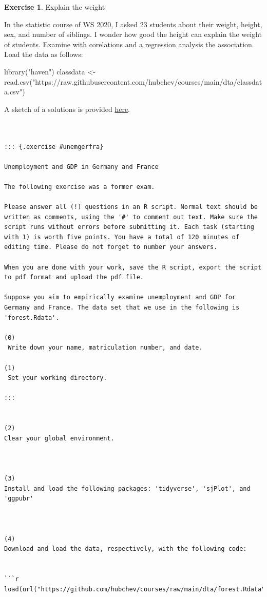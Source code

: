 \documentclass[
  12pt,
  oneside]{book}
\newenvironment{Shaded}{\begin{snugshade}}{\end{snugshade}}
\newcommand{\FunctionTok}[1]{\textcolor[rgb]{0.00,0.00,0.00}{#1}}
\newcommand{\NormalTok}[1]{#1}
\newcommand{\OtherTok}[1]{\textcolor[rgb]{0.56,0.35,0.01}{#1}}
\newcommand{\StringTok}[1]{\textcolor[rgb]{0.31,0.60,0.02}{#1}}
\theoremstyle{definition}
\theoremstyle{definition}
\theoremstyle{definition}
\newtheorem{exercise}{Exercise}[chapter]
\theoremstyle{definition}
\theoremstyle{remark}
\begin{document}
\begin{exercise}
\protect\hypertarget{exr:explainweight}{}\label{exr:explainweight}Explain the weight

In the statistic course of WS 2020, I asked 23 students about their weight, height, sex, and number of siblings. I wonder how good the height can explain the weight of students. Examine with corelations and a regression analysis the association. Load the data as follows:
\end{exercise}

\begin{Shaded}
\begin{Highlighting}[]
\FunctionTok{library}\NormalTok{(}\StringTok{"haven"}\NormalTok{)}
\NormalTok{classdata }\OtherTok{\textless{}{-}} \FunctionTok{read.csv}\NormalTok{(}\StringTok{"https://raw.githubusercontent.com/hubchev/courses/main/dta/classdata.csv"}\NormalTok{)}
\end{Highlighting}
\end{Shaded}

A sketch of a solutions is provided \href{https://raw.githubusercontent.com/hubchev/courses/main/scr/regress_lecture.R}{here}.

\begin{verbatim}


::: {.exercise #unemgerfra}

Unemployment and GDP in Germany and France

The following exercise was a former exam.

Please answer all (!) questions in an R script. Normal text should be written as comments, using the '#' to comment out text. Make sure the script runs without errors before submitting it. Each task (starting with 1) is worth five points. You have a total of 120 minutes of editing time. Please do not forget to number your answers.
 
When you are done with your work, save the R script, export the script to pdf format and upload the pdf file.

Suppose you aim to empirically examine unemployment and GDP for Germany and France. The data set that we use in the following is 'forest.Rdata'.

(0)    
 Write down your name, matriculation number, and date.

(1)    
 Set your working directory. 

:::


(2)    
Clear your global environment.
 


(3)    
Install and load the following packages: 'tidyverse', 'sjPlot', and 'ggpubr'
 


(4)    
Download and load the data, respectively, with the following code: 
 

```r
load(url("https://github.com/hubchev/courses/raw/main/dta/forest.Rdata"))
\end{verbatim}
\end{document}

